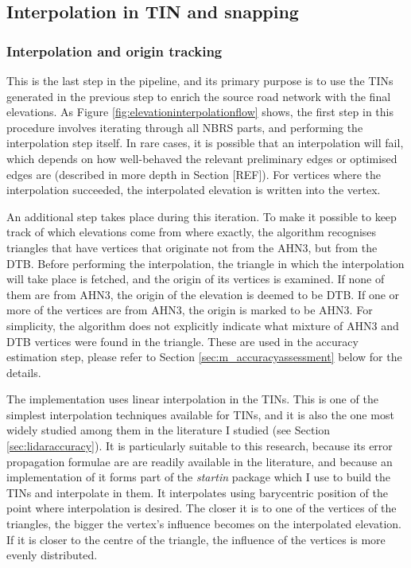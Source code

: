 \subsection{Interpolation in TIN and snapping}
\label{sub:m_interpolation}

\subsubsection{Interpolation and origin tracking}

This is the last step in the pipeline, and its primary purpose is to use the TINs generated in the previous step to enrich the source road network with the final elevations. As Figure \ref{fig:elevationinterpolationflow} shows, the first step in this procedure involves iterating through all NBRS parts, and performing the interpolation step itself. In rare cases, it is possible that an interpolation will fail, which depends on how well-behaved the relevant preliminary edges or optimised edges are (described in more depth in Section [REF]). For vertices where the interpolation succeeded, the interpolated elevation is written into the vertex.

An additional step takes place during this iteration. To make it possible to keep track of which elevations come from where exactly, the algorithm recognises triangles that have vertices that originate not from the AHN3, but from the DTB. Before performing the interpolation, the triangle in which the interpolation will take place is fetched, and the origin of its vertices is examined. If none of them are from AHN3, the origin of the elevation is deemed to be DTB. If one or more of the vertices are from AHN3, the origin is marked to be AHN3. For simplicity, the algorithm does not explicitly indicate what mixture of AHN3 and DTB vertices were found in the triangle. These are used in the accuracy estimation step, please refer to Section \ref{sec:m_accuracyassessment} below for the details.

The implementation uses linear interpolation in the TINs. This is one of the simplest interpolation techniques available for TINs, and it is also the one most widely studied among them in the literature I studied (see Section \ref{sec:lidaraccuracy}). It is particularly suitable to this research, because its error propagation formulae are are readily available in the literature, and because an implementation of it forms part of the \textit{startin} package which I use to build the TINs and interpolate in them. It interpolates using barycentric position of the point where interpolation is desired. The closer it is to one of the vertices of the triangles, the bigger the vertex's influence becomes on the interpolated elevation. If it is closer to the centre of the triangle, the influence of the vertices is more evenly distributed.

